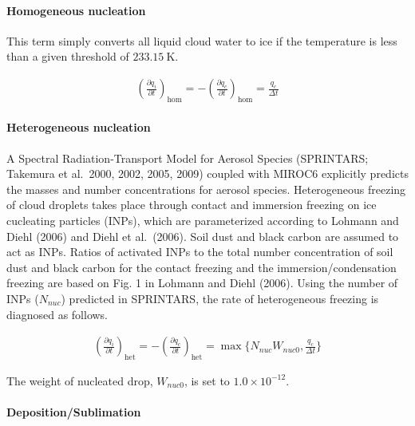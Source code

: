 \hypertarget{homogeneous-nucleation}{%
\paragraph{Homogeneous nucleation}\label{homogeneous-nucleation}}

This term simply converts all liquid cloud water to ice if the
temperature is less than a given threshold of \(233.15 \mathrm{~K}\).

\begin{eqnarray}
\left(\frac{\partial q_i}{\partial t}\right)_{\text {hom}}
=-\left(\frac{\partial q_c}{\partial t}\right)_{\text {hom}}
=  \frac{q_c}{\Delta t}
\end{eqnarray}

\hypertarget{heterogeneous-nucleation}{%
\paragraph{Heterogeneous nucleation}\label{heterogeneous-nucleation}}

A Spectral Radiation-Transport Model for Aerosol Species (SPRINTARS;
Takemura et al.~2000, 2002, 2005, 2009) coupled with MIROC6 explicitly
predicts the masses and number concentrations for aerosol species.
Heterogeneous freezing of cloud droplets takes place through contact and
immersion freezing on ice cucleating particles (INPs), which are
parameterized according to Lohmann and Diehl (2006) and Diehl et
al.~(2006). Soil dust and black carbon are assumed to act as INPs.
Ratios of activated INPs to the total number concentration of soil dust
and black carbon for the contact freezing and the immersion/condensation
freezing are based on Fig. 1 in Lohmann and Diehl (2006). Using the
number of INPs (\(N_{nuc}\)) predicted in SPRINTARS, the rate of
heterogeneous freezing is diagnosed as follows.

\begin{eqnarray}
\left(\frac{\partial q_i}{\partial t}\right)_{\text {het}}
=-\left(\frac{\partial q_c}{\partial t}\right)_{\text {het}}
=  \max \{N_{nuc} W_{nuc0}, \frac{q_c}{\Delta t}\}
\end{eqnarray}

The weight of nucleated drop, \(W_{nuc0}\), is set to
\(1.0\times10^{-12}\).

\hypertarget{depositionsublimation}{%
\paragraph{Deposition/Sublimation}\label{depositionsublimation}}

